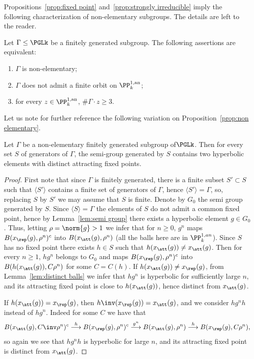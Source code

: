 Propositions~\ref{prop:fixed point} and~\ref{prop:strongly irreducible} imply the following characterization of non-elementary subgroups. The details are left to the reader.

\begin{prop}
Let $\Gamma\leq \PGLk$ be a finitely generated subgroup. The following assertions are equivalent:
\begin{enumerate}
\item $\Gamma$ is non-elementary;
\item $\Gamma$ does not admit a finite orbit on $\PP^{1, \mathrm{an}}_k$;
\item for every $z\in \PP^{1, \mathrm{an}}_k$, $\# \Gamma \cdot z\geq 3$.
\end{enumerate}
\end{prop}

Let us note for further reference the following variation on Proposition~\ref{prop:non elementary}.

\begin{lemm}\label{lem:proximal semi group}
Let $\Gamma$ be a non-elementary finitely generated subgroup of\linebreak $\PGLk$. Then for every set $S$ of generators of $\Gamma$, the semi-group generated by $S$ contains two hyperbolic elements with distinct attracting fixed points.
\end{lemm}

\begin{proof}
First note that since $\Gamma$ is finitely generated, there is a finite subset $S'\subset S$ such that $\langle S'\rangle$ contains a finite set of generators of $\Gamma$, hence $\langle S'\rangle = \Gamma$, so, replacing $S$ by $S'$ we may assume that $S$ is finite. Denote by $G_0$ the semi group generated by $S$. Since $\langle S\rangle = \Gamma$ the elements of $S$ do not admit a common fixed point, hence by Lemma~\ref{lem:semi group} there exists a hyperbolic element $g\in G_0$. Thus, letting $\rho = \norm{g}>1$ we infer that for $n\geq 0$, $g^n$ maps $B(x_\rep(g), \rho^n)^c$ into $B(x_\att(g), \rho^n)$ (all the balls here are in $\PP^{1, an}_k$). Since $S$ has no fixed point there exists $h\in S$ such that $h(x_\att(g))\neq x_\att(g)$. Then for every $n\geq 1$, $hg^n$ belongs to $G_0$ and maps $B(x_\rep(g), \rho^n)^c$ into $B(h(x_\att(g)), C\rho^n)$ for some $C = C(h)$. If $h(x_\att(g))\neq x_\rep(g)$, from Lemma~\ref{lem:distinct balls} we infer that $hg^n$ is hyperbolic for sufficiently large $n$, and its attracting fixed point is close to $h(x_\att(g))$, hence distinct from $x_\att(g)$.

If $h(x_\att(g))= x_\rep(g)$, then $h\inv(x_\rep(g)) =x_\att(g)$, and we consider $hg^n h$ instead of $hg^n$. Indeed for some $C$ we have that
\[
B(x_\att(g), C\inv\rho^n)^c\overset{h}\longrightarrow B(x_\rep(g), \rho^n)^c\overset{g^n}\longrightarrow B(x_\att(g), \rho^n)
\overset{h}\longrightarrow B(x_\rep(g), C \rho^n),
\]
so again we see that $hg^nh$ is hyperbolic for large $n$, and its attracting fixed point is distinct from $x_\att(g)$.
\end{proof}

